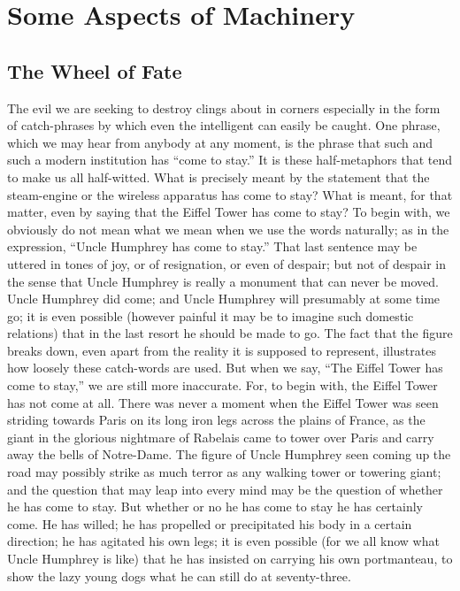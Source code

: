 \documentclass{book}
\begin{document}
\setcounter{chapter}{0}\part{Some Aspects of Machinery}
\label{chapter-14}
\chapter{The Wheel of Fate}
\label{chapter-15}
The evil we are seeking to destroy clings about in corners especially in the form of catch-phrases by which even the intelligent can easily be caught. One phrase, which we may hear from anybody at any moment, is the phrase that such and such a modern institution has “come to stay.” It is these half-metaphors that tend to make us all half-witted. What is precisely meant by the statement that the steam-engine or the wireless apparatus has come to stay? What is meant, for that matter, even by saying that the Eiffel Tower has come to stay? To begin with, we obviously do not mean what we mean when we use the words naturally; as in the expression, “Uncle Humphrey has come to stay.” That last sentence may be uttered in tones of joy, or of resignation, or even of despair; but not of despair in the sense that Uncle Humphrey is really a monument that can never be moved. Uncle Humphrey did come; and Uncle Humphrey will presumably at some time go; it is even possible (however painful it may be to imagine such domestic relations) that in the last resort he should be made to go. The fact that the figure breaks down, even apart from the reality it is supposed to represent, illustrates how loosely these catch-words are used. But when we say, “The Eiffel Tower has come to stay,” we are still more inaccurate. For, to begin with, the Eiffel Tower has not come at all. There was never a moment when the Eiffel Tower was seen striding towards Paris on its long iron legs across the plains of France, as the giant in the glorious nightmare of Rabelais came to tower over Paris and carry away the bells of Notre-Dame. The figure of Uncle Humphrey seen coming up the road may possibly strike as much terror as any walking tower or towering giant; and the question that may leap into every mind may be the question of whether he has come to stay. But whether or no he has come to stay he has certainly come. He has willed; he has propelled or precipitated his body in a certain direction; he has agitated his own legs; it is even possible (for we all know what Uncle Humphrey is like) that he has insisted on carrying his own portmanteau, to show the lazy young dogs what he can still do at seventy-three.
\end{document}
